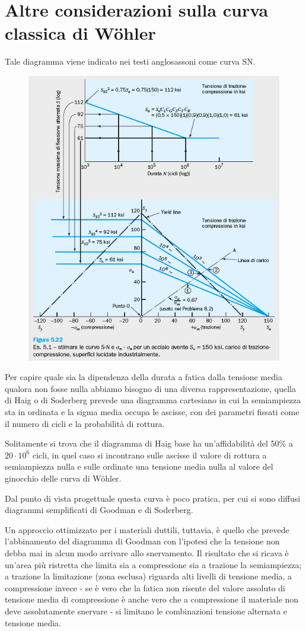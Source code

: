 \section{Altre considerazioni sulla curva classica di Wöhler}		
			Tale diagramma viene indicato nei testi anglosassoni come curva SN. 
			\begin{figure}[H]
				\centering
				\includegraphics[width=0.5\linewidth]{immagini_11/screenshot009}
				\label{fig:screenshot009}
			\end{figure}
			Per capire quale sia la dipendenza della durata a fatica dalla tensione media qualora non fosse nulla abbiamo bisogno di una diversa rappresentazione, quella di Haig o di Soderberg prevede una diagramma cartesiano in cui la semiampiezza sta in ordinata e la sigma media occupa le ascisse, con dei parametri fissati come il numero di cicli e la probabilità di rottura.
			
			Solitamente si trova che il diagramma di Haig base ha un'affidabilità del 50\% a $20\cdot10^6$ cicli, in quel caso si incontrano sulle ascisse il valore di rottura a semiampiezza nulla e sulle ordinate una tensione media nulla al valore del ginocchio delle curva di Wöhler. 
			
			Dal punto di vista progettuale questa curva è poco pratica, per cui si sono diffusi diagrammi semplificati di Goodman e di Soderberg. 
			
			Un approccio ottimizzato per i materiali duttili, tuttavia, è quello che prevede l'abbinamento del diagramma di Goodman con l'ipotesi che la tensione non debba mai in alcun modo arrivare allo snervamento. Il risultato che si ricava è un'area più ristretta che limita sia a compressione sia a trazione la semiampiezza; a trazione la limitazione (zona esclusa) riguarda alti livelli di tensione media, a compressione invece - se è vero che la fatica non risente del valore assoluto di tensione media di compressione è anche vero che a compressione il materiale non deve assolutamente snervare - si limitano le combinazioni tensione alternata e tensione media. \newline
			
